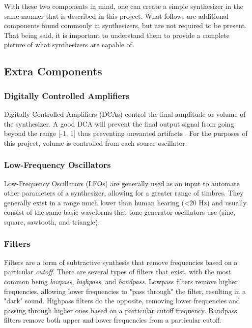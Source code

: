 \documentclass[12pt]{article}
\begin{document}
With these two components in mind, one can create a simple synthesizer in the same manner that is described in this project. What follows are additional components found commonly in synthesizers, but are not required to be present. That being said, it is important to understand them to provide a complete picture of what synthesizers are capable of. 

\subsection{Extra Components}

\subsubsection*{Digitally Controlled Amplifiers}
Digitally Controlled Amplifiers (DCAs) control the final amplitude or volume of the synthesizer. A good DCA will prevent the final output signal from going beyond the range [-1, 1] thus preventing unwanted artifacts \cite{Pirkle_2015}. For the purposes of this project, volume is controlled from each source oscillator.

\subsubsection*{Low-Frequency Oscillators}
Low-Frequency Oscillators (LFOs) are generally used as an input to automate other parameters of a synthesizer, allowing for a greater range of timbres. They generally exist in a range much lower than human hearing (\textless 20 Hz) and usually consist of the same basic waveforms that tone generator oscillators use (sine, square, sawtooth, and triangle).

\subsubsection*{Filters}
Filters are a form of subtractive synthesis that remove frequencies based on a particular \textit{cutoff}. There are several types of filters that exist, with the most common being \textit{lowpass}, \textit{highpass}, and \textit{bandpass}. Lowpass filters remove higher frequencies, allowing lower frequencies to "pass through" the filter, resulting in a "dark" sound. Highpass filters do the opposite, removing lower frequencies and passing through higher ones based on a particular cutoff frequency. Bandpass filters remove both upper and lower frequencies from a particular cutoff.
\end{document}
